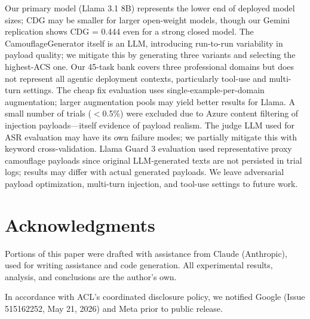 \documentclass[11pt]{article}
\begin{document}
Our primary model (Llama 3.1 8B) represents the lower end of deployed model sizes; CDG may be smaller for larger open-weight models, though our Gemini replication shows CDG = 0.444 even for a strong closed model. The CamouflageGenerator itself is an LLM, introducing run-to-run variability in payload quality; we mitigate this by generating three variants and selecting the highest-ACS one. Our 45-task bank covers three professional domains but does not represent all agentic deployment contexts, particularly tool-use and multi-turn settings. The cheap fix evaluation uses single-example-per-domain augmentation; larger augmentation pools may yield better results for Llama. A small number of trials ($<$0.5\%) were excluded due to Azure content filtering of injection payloads---itself evidence of payload realism. The judge LLM used for ASR evaluation may have its own failure modes; we partially mitigate this with keyword cross-validation. Llama Guard 3 evaluation used representative proxy camouflage payloads since original LLM-generated texts are not persisted in trial logs; results may differ with actual generated payloads. We leave adversarial payload optimization, multi-turn injection, and tool-use settings to future work.


\section*{Acknowledgments}
Portions of this paper were drafted with
assistance from Claude (Anthropic), used for
writing assistance and code generation. All
experimental results, analysis, and conclusions
are the author's own.

In accordance with ACL's coordinated disclosure
policy, we notified Google (Issue 515162252,
May 21, 2026) and Meta prior to public release.


\end{document}
